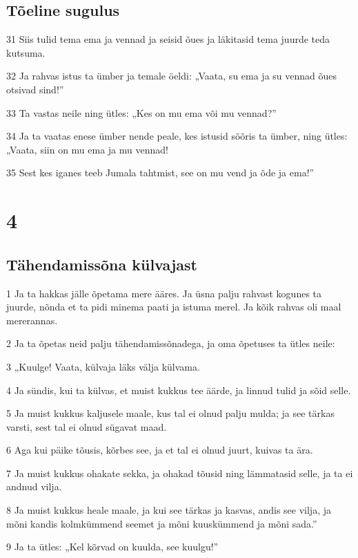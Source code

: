 \section*{Tõeline sugulus}

\par 31 Siis tulid tema ema ja vennad ja seisid õues ja läkitasid tema juurde teda kutsuma.
\par 32 Ja rahvas istus ta ümber ja temale öeldi: „Vaata, su ema ja su vennad õues otsivad sind!”
\par 33 Ta vastas neile ning ütles: „Kes on mu ema või mu vennad?”
\par 34 Ja ta vaatas enese ümber nende peale, kes istusid sõõris ta ümber, ning ütles: „Vaata, siin on mu ema ja mu vennad!
\par 35 Sest kes iganes teeb Jumala tahtmist, see on mu vend ja õde ja ema!”


\chapter{4}

\section*{Tähendamissõna külvajast}

\par 1 Ja ta hakkas jälle õpetama mere ääres. Ja üsna palju rahvast kogunes ta juurde, nõnda et ta pidi minema paati ja istuma merel. Ja kõik rahvas oli maal mererannas.
\par 2 Ja ta õpetas neid palju tähendamissõnadega, ja oma õpetuses ta ütles neile:
\par 3 „Kuulge! Vaata, külvaja läks välja külvama.
\par 4 Ja sündis, kui ta külvas, et muist kukkus tee äärde, ja linnud tulid ja sõid selle.
\par 5 Ja muist kukkus kaljusele maale, kus tal ei olnud palju mulda; ja see tärkas varsti, sest tal ei olnud sügavat maad.
\par 6 Aga kui päike tõusis, kõrbes see, ja et tal ei olnud juurt, kuivas ta ära.
\par 7 Ja muist kukkus ohakate sekka, ja ohakad tõusid ning lämmatasid selle, ja ta ei andnud vilja.
\par 8 Ja muist kukkus heale maale, ja kui see tärkas ja kasvas, andis see vilja, ja mõni kandis kolmkümmend seemet ja mõni kuuskümmend ja mõni sada.”
\par 9 Ja ta ütles: „Kel kõrvad on kuulda, see kuulgu!”


